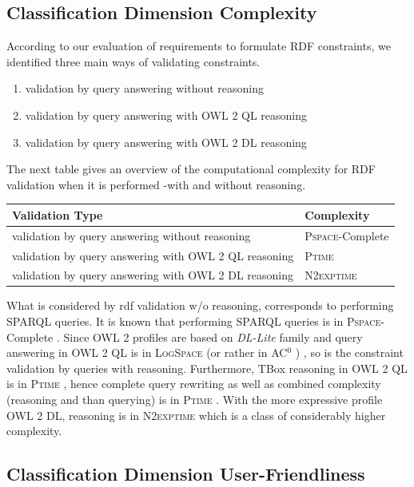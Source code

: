 \documentclass{llncs}
\newenvironment{complexity}{
  \scriptsize
  \sffamily
  \vspace{0.3cm}
  \begin{tabular}{l|l}
  \hline
  \textbf{Validation Type} & \textbf{Complexity} \\
  \hline

}{
  \hline
  \end{tabular}
  \linebreak
}
\begin{document}
\subsection{Classification Dimension Complexity}

According to our evaluation of requirements to formulate RDF constraints, we identified three main ways of validating constraints.

\begin{enumerate}
	\item validation by query answering without reasoning
	\item validation by query answering with OWL 2 QL reasoning
	\item validation by query answering with OWL 2 DL reasoning
\end{enumerate}

The next table gives an overview of the computational complexity for RDF validation when it is performed -with and without reasoning. 

\begin{complexity}
validation by query answering without reasoning & \textsc{Pspace}-Complete \\
validation by query answering with OWL 2 QL reasoning & \textsc{Ptime} \\
validation by query answering with OWL 2 DL reasoning & \textsc{N2exptime} \\
\end{complexity}

What is considered by rdf validation w/o reasoning, corresponds to performing SPARQL queries.  It is known that performing SPARQL queries is in \textsc{Pspace}-Complete \cite{Perez2009}. Since OWL 2 profiles are based on \textit{DL-Lite} family and query answering in OWL 2 QL is in \textsc{LogSpace} (or rather in AC$^0$ ) \cite{Calvanese2007}, so is the constraint validation by queries with  reasoning. Furthermore, TBox reasoning in OWL 2 QL is in \textsc{Ptime} \cite{Calvanese2007}, hence complete query rewriting as well as combined complexity (reasoning and than querying) is in \textsc{Ptime} \cite{Artale2009,Calvanese2007}.  With the more expressive profile OWL 2 DL, reasoning is in \textsc{N2exptime} \cite{owl2profiles2008} which is a class of considerably higher complexity.

\subsection{Classification Dimension User-Friendliness}
\end{document}
